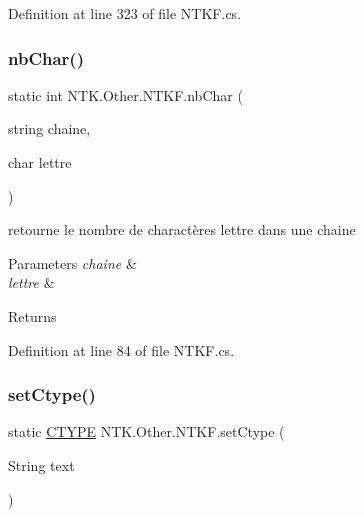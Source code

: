 Definition at line 323 of file N\+T\+K\+F.\+cs.

\mbox{\label{class_n_t_k_1_1_other_1_1_n_t_k_f_a81913a5a3802276bcfe93c7ccac75d50}} 
\subsubsection{\texorpdfstring{nbChar()}{nbChar()}}
{\footnotesize\ttfamily static int N\+T\+K.\+Other.\+N\+T\+K\+F.\+nb\+Char (\begin{DoxyParamCaption}\item[{string}]{chaine,  }\item[{char}]{lettre }\end{DoxyParamCaption})\hspace{0.3cm}{\ttfamily [static]}}



retourne le nombre de charactères lettre dans une chaine 


\begin{DoxyParams}{Parameters}
{\em chaine} & \\
\hline
{\em lettre} & \\
\hline
\end{DoxyParams}
\begin{DoxyReturn}{Returns}

\end{DoxyReturn}


Definition at line 84 of file N\+T\+K\+F.\+cs.

\mbox{\label{class_n_t_k_1_1_other_1_1_n_t_k_f_a8d685180b73e5691dc61cfb950ea2c94}} 
\subsubsection{\texorpdfstring{setCtype()}{setCtype()}}
{\footnotesize\ttfamily static \mbox{\hyperlink{namespace_n_t_k_a8fa28c7c4270bbb81ee96b4f632fdbec}{C\+T\+Y\+PE}} N\+T\+K.\+Other.\+N\+T\+K\+F.\+set\+Ctype (\begin{DoxyParamCaption}\item[{String}]{text }\end{DoxyParamCaption})\hspace{0.3cm}{\ttfamily [static]}}



